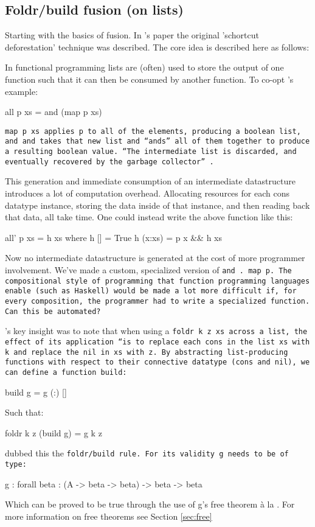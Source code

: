 \subsection{Foldr/build fusion (on lists)}
Starting with the basics of fusion. In \cite{Gill1993}'s paper the original 'schortcut deforestation' technique was described. The core idea is described here as follows:

In functional programming lists are (often) used to store the output of one function such that it can then be consumed by another function. To co-opt \cite{Gill1993}'s example:
\begin{code}
    all p xs = and (map p xs)
\end{code}

\tt{map p xs} applies \tt{p} to all of the elements, producing a boolean list, and \tt{and} takes that new list and ``ands'' all of them together to produce a resulting boolean value. ``The intermediate list is discarded, and eventually recovered by the garbage collector'' \citep{Gill1993}.

This generation and immediate consumption of an intermediate datastructure introduces a lot of computation overhead. Allocating resources for each cons datatype instance, storing the data inside of that instance, and then reading back that data, all take time. One could instead write the above function like this:
\begin{code}
    all' p xs = h xs
       where h []     = True
             h (x:xs) = p x && h xs
\end{code}
Now no intermediate datastructure is generated at the cost of more programmer involvement. We've made a custom, specialized version of \tt{and~.~map~p}. The compositional style of programming that function programming languages enable (such as Haskell) would be made a lot more difficult if, for every composition, the programmer had to write a specialized function. Can this be automated?

\cite{Gill1993}'s key insight was to note that when using a \tt{foldr k z xs} across a list, the effect of its application ``is to replace each \tt{cons} in the list \tt{xs} with k and replace the \tt{nil} in \tt{xs} with \tt{z}. By abstracting list-producing functions with respect to their connective datatype (\tt{cons} and \tt{nil}), we can define a function \tt{build}:
\begin{code}
    build g = g (:) []
\end{code}
Such that:
\begin{code}
    foldr k z (build g) = g k z
\end{code}
\cite{Gill1993} dubbed this the \tt{foldr/build} rule. For its validity \tt{g} needs to be of type:
\begin{code}
    g : forall beta : (A -> beta -> beta) -> beta -> beta
\end{code}
Which can be proved to be true through the use of g's free theorem \`a la \cite{Wadler1989}. For more information on free theorems see Section \ref{sec:free}


